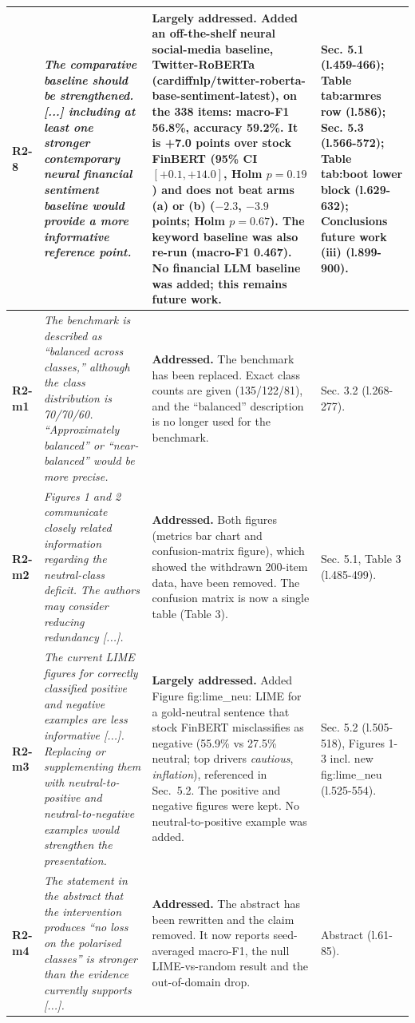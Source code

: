 \documentclass[10pt]{article}
\begin{document}
\begin{longtable}{>{\raggedright\arraybackslash}p{1.1cm}>{\raggedright\arraybackslash}p{8.2cm}>{\raggedright\arraybackslash}p{9.0cm}>{\raggedright\arraybackslash}p{6.0cm}}
\textbf{R2-8} & \emph{The comparative baseline should be strengthened. [...] including at least one stronger contemporary neural financial sentiment baseline would provide a more informative reference point.} & \textbf{Largely addressed.} Added an off-the-shelf neural social-media baseline, Twitter-RoBERTa (cardiffnlp/twitter-roberta-base-sentiment-latest), on the 338 items: macro-F1 56.8\%, accuracy 59.2\%. It is +7.0 points over stock FinBERT (95\% CI $[+0.1,+14.0]$, Holm $p=0.19$) and does not beat arms (a) or (b) ($-2.3$, $-3.9$ points; Holm $p=0.67$). The keyword baseline was also re-run (macro-F1 0.467). No financial LLM baseline was added; this remains future work. & Sec. 5.1 (l.459-466); Table tab:armres row (l.586); Sec. 5.3 (l.566-572); Table tab:boot lower block (l.629-632); Conclusions future work (iii) (l.899-900). \\ \midrule
\textbf{R2-m1} & \emph{The benchmark is described as ``balanced across classes,'' although the class distribution is 70/70/60. ``Approximately balanced'' or ``near-balanced'' would be more precise.} & \textbf{Addressed.} The benchmark has been replaced. Exact class counts are given (135/122/81), and the ``balanced'' description is no longer used for the benchmark. & Sec. 3.2 (l.268-277). \\ \midrule
\textbf{R2-m2} & \emph{Figures 1 and 2 communicate closely related information regarding the neutral-class deficit. The authors may consider reducing redundancy [...].} & \textbf{Addressed.} Both figures (metrics bar chart and confusion-matrix figure), which showed the withdrawn 200-item data, have been removed. The confusion matrix is now a single table (Table 3). & Sec. 5.1, Table 3 (l.485-499). \\ \midrule
\textbf{R2-m3} & \emph{The current LIME figures for correctly classified positive and negative examples are less informative [...]. Replacing or supplementing them with neutral-to-positive and neutral-to-negative examples would strengthen the presentation.} & \textbf{Largely addressed.} Added Figure fig:lime\_neu: LIME for a gold-neutral sentence that stock FinBERT misclassifies as negative (55.9\% vs 27.5\% neutral; top drivers \emph{cautious}, \emph{inflation}), referenced in Sec.~5.2. The positive and negative figures were kept. No neutral-to-positive example was added. & Sec. 5.2 (l.505-518), Figures 1-3 incl. new fig:lime\_neu (l.525-554). \\ \midrule
\textbf{R2-m4} & \emph{The statement in the abstract that the intervention produces ``no loss on the polarised classes'' is stronger than the evidence currently supports [...].} & \textbf{Addressed.} The abstract has been rewritten and the claim removed. It now reports seed-averaged macro-F1, the null LIME-vs-random result and the out-of-domain drop. & Abstract (l.61-85). \\ \midrule

\end{longtable}
\end{document}
